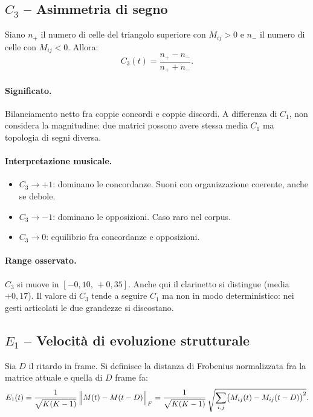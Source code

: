 \documentclass[a4paper,11pt]{article}
\begin{document}
\subsection{$C_3$ -- Asimmetria di segno}

\formula
Siano $n_+$ il numero di celle del triangolo superiore con $M_{ij} > 0$
e $n_-$ il numero di celle con $M_{ij} < 0$. Allora:
\[
C_3(t) = \frac{n_+ - n_-}{n_+ + n_-}.
\]

\paragraph{Significato.}
Bilanciamento netto fra coppie concordi e coppie discordi. A differenza
di $C_1$, non considera la magnitudine: due matrici possono avere stessa
media $C_1$ ma topologia di segni diversa.

\paragraph{Interpretazione musicale.}
\begin{itemize}[nosep]
  \item $C_3 \to +1$: dominano le concordanze. Suoni con organizzazione
        coerente, anche se debole.
  \item $C_3 \to -1$: dominano le opposizioni. Caso raro nel corpus.
  \item $C_3 \to 0$: equilibrio fra concordanze e opposizioni.
\end{itemize}

\paragraph{Range osservato.}
$C_3$ si muove in $[-0{,}10,\, +0{,}35]$. Anche qui il clarinetto si
distingue (media $+0{,}17$). Il valore di $C_3$ tende a seguire $C_1$
ma non in modo deterministico: nei gesti articolati le due grandezze
si discostano.

\subsection{$E_1$ -- Velocità di evoluzione strutturale}

\formula
Sia $D$ il ritardo in frame. Si definisce la distanza di Frobenius
normalizzata fra la matrice attuale e quella di $D$ frame fa:
\[
E_1(t) = \frac{1}{\sqrt{K(K-1)}}\,
        \Bigl\| M(t) - M(t - D) \Bigr\|_F
      = \frac{1}{\sqrt{K(K-1)}}\,
        \sqrt{\sum_{i,j} \bigl( M_{ij}(t) - M_{ij}(t-D) \bigr)^2}.
\]
\end{document}
